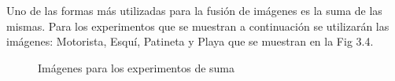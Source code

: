 Uno de las formas m\'as utilizadas para la fusi\'on de im\'agenes es la suma de las mismas. Para los experimentos que se muestran a continuaci\'on se utilizar\'an las im\'agenes: Motorista, Esqu\'i, Patineta y Playa que se muestran en la Fig 3.4.

\begin{figure}
	\begin{center}
		\caption{Im\'agenes para los experimentos de suma}
	\end{center}
\end{figure}

